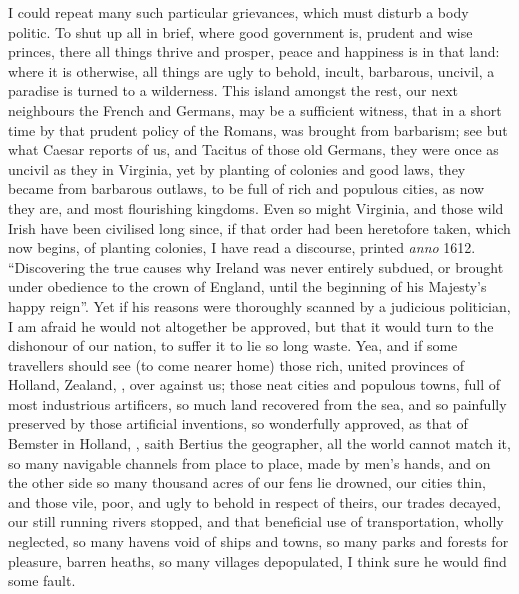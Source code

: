 I could repeat many such particular grievances, which must disturb a body
politic. To shut up all in brief, where good government is, prudent and wise
princes, there all things thrive and prosper, peace and happiness is in that
land: where it is otherwise, all things are ugly to behold, incult, barbarous,
uncivil, a paradise is turned to a wilderness. This island amongst the rest,
our next neighbours the French and Germans, may be a sufficient witness, that
in a short time by that prudent policy of the Romans, was brought from
barbarism; see but what Caesar reports of us, and Tacitus of those old Germans,
they were once as uncivil as they in Virginia, yet by planting of colonies and
good laws, they became from barbarous outlaws, to be full
of rich and populous cities, as now they are, and most flourishing kingdoms.
Even so might Virginia, and those wild Irish have been civilised long since, if
that order had been heretofore taken, which now begins, of planting colonies,
\etc{} I have read a discourse, printed \emph{anno} 1612.
\enquote{Discovering the true causes why Ireland was never entirely subdued, or brought
under obedience to the crown of England, until the beginning of his Majesty's
happy reign}. Yet if his reasons were thoroughly scanned by a judicious
politician, I am afraid he would not altogether be approved, but that it would
turn to the dishonour of our nation, to suffer it to lie so long waste. Yea,
and if some travellers should see (to come nearer home) those rich, united
provinces of Holland, Zealand, \etc{}, over against us; those neat cities and
populous towns, full of most industrious artificers, so
much land recovered from the sea, and so painfully preserved by those
artificial inventions, so wonderfully approved, as that of Bemster in Holland,
, saith Bertius the
geographer, all the world cannot match it, so many
navigable channels from place to place, made by men's hands, \etc{} and on the
other side so many thousand acres of our fens lie drowned, our cities thin, and
those vile, poor, and ugly to behold in respect of theirs, our trades decayed,
our still running rivers stopped, and that beneficial use of transportation,
wholly neglected, so many havens void of ships and towns, so many parks and
forests for pleasure, barren heaths, so many villages depopulated, \etc{} I
think sure he would find some fault.

